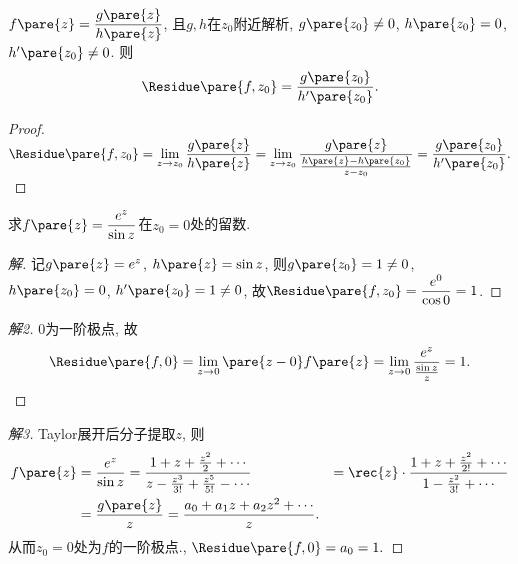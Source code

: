 \documentclass{ctexart}
\begin{document}
\begin{sample}
    \begin{ex}
        $\displaystyle f\pare{z} = \frac{g\pare{z}}{h\pare{z}}$, 且$g,h$在$z_0$附近解析, $g\pare{z_0}\neq 0$, $h\pare{z_0} = 0$, $h'\pare{z_0}\neq 0$. 则
        \[ \Residue \pare{f,z_0} = \frac{g\pare{z_0}}{h'\pare{z_0}}. \]
    \end{ex}
    \begin{proof}
        $\displaystyle
            \Residue\pare{f,z_0} = \lim_{z\rightarrow z_0} \frac{g\pare{z}}{h\pare{z}} = \lim_{z\rightarrow z_0} \frac{g\pare{z}}{\frac{h\pare{z}-h\pare{z_0}}{z-z_0}} = \frac{g\pare{z_0}}{h'\pare{z_0}}.
        $
    \end{proof}
\end{sample}
\begin{sample}
    \begin{ex}
        求$\displaystyle f\pare{z} = \frac{e^z}{\sin z}$在$z_0=0$处的留数.
    \end{ex}
    \begin{proof}[解]
        记$g\pare{z} = e^z$, $h\pare{z} = \sin z$, 则$g\pare{z_0} = 1\neq 0$, $h\pare{z_0} = 0$, $h'\pare{z_0} = 1\neq 0$, 故$\Residue\pare{f,z_0} = \displaystyle \frac{e^0}{\cos 0} = 1$.
    \end{proof}
    \begin{proof}[解2]
        $0$为一阶极点, 故
        \[ \Residue\pare{f,0} = \lim_{z\rightarrow 0} \pare{z-0}f\pare{z} = \lim_{z\rightarrow 0} \frac{e^z}{\frac{\sin z}{z}} = 1. \qedhere \]
    \end{proof}
    \begin{proof}[解3]
        Taylor展开后分子提取$z$, 则
        \begin{align*}
            f\pare{z} &= \frac{e^z}{\sin z} = \frac{1+z + \frac{z^2}{2} + \cdots}{z-\frac{z^3}{3!} + \frac{z^5}{5!} - \cdots} 
            &= \rec{z} \cdot \frac{1 + z + \frac{z^2}{2!} + \cdots}{1 - \frac{z^2}{3!} + \cdots} \\
            &= \frac{g\pare{z}}{z} = \frac{a_0 + a_1 z + a_2 z^2 + \cdots}{z}.
        \end{align*}
        从而$z_0 = 0$处为$f$的一阶极点., $\Residue\pare{f,0} = a_0 = 1.$
    \end{proof}
\end{sample}
\end{document}

